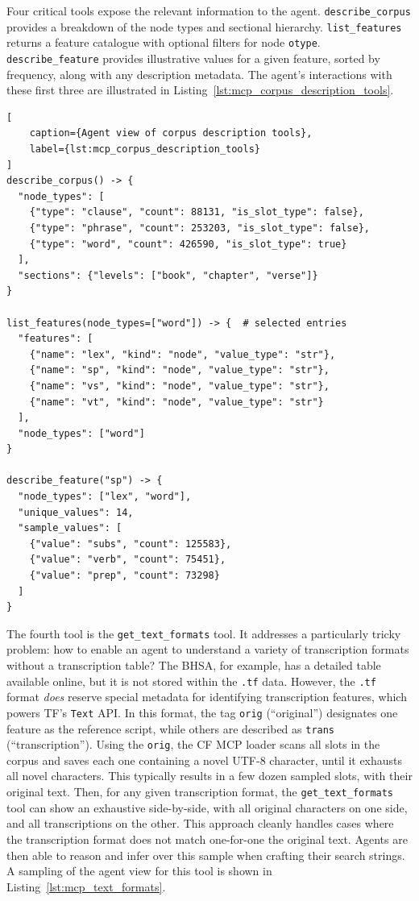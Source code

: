 \documentclass[11pt,a4paper]{article}
\begin{document}
Four critical tools expose the relevant information to the agent. \texttt{describe\_corpus}
provides a breakdown of the node types and sectional hierarchy. \texttt{list\_features}
returns a feature catalogue with optional filters for node \texttt{otype}.
\texttt{describe\_feature} provides illustrative values for a given feature, sorted by frequency,
along with any description metadata. The agent's interactions with these
first three are illustrated in Listing~\ref{lst:mcp_corpus_description_tools}.

\begin{lstlisting}[
    caption={Agent view of corpus description tools},
    label={lst:mcp_corpus_description_tools}
]
describe_corpus() -> {
  "node_types": [
    {"type": "clause", "count": 88131, "is_slot_type": false},
    {"type": "phrase", "count": 253203, "is_slot_type": false},
    {"type": "word", "count": 426590, "is_slot_type": true}
  ],
  "sections": {"levels": ["book", "chapter", "verse"]}
}

list_features(node_types=["word"]) -> {  # selected entries
  "features": [
    {"name": "lex", "kind": "node", "value_type": "str"},
    {"name": "sp", "kind": "node", "value_type": "str"},
    {"name": "vs", "kind": "node", "value_type": "str"},
    {"name": "vt", "kind": "node", "value_type": "str"}
  ],
  "node_types": ["word"]
}

describe_feature("sp") -> {
  "node_types": ["lex", "word"],
  "unique_values": 14,
  "sample_values": [
    {"value": "subs", "count": 125583},
    {"value": "verb", "count": 75451},
    {"value": "prep", "count": 73298}
  ]
}

\end{lstlisting}

The fourth tool is the \texttt{get\_text\_formats} tool. It addresses a particularly tricky
problem: how to enable an agent to understand a variety of transcription formats without
a transcription table? The BHSA, for example, has a detailed table available online,
but it is not stored within the \texttt{.tf} data. However, the \texttt{.tf} format \textit{does}
reserve special metadata for identifying transcription features, which powers TF's \texttt{Text}
API. In this format, the tag \texttt{orig} (``original'') designates one feature as the reference script,
while others are described as \texttt{trans} (``transcription''). Using the \texttt{orig}, the CF
MCP loader scans all slots in the corpus and saves each one containing a novel UTF-8 character,
until it exhausts all novel characters. This typically results in a few dozen sampled slots,
with their original text. Then, for any given transcription format, the \texttt{get\_text\_formats} tool
can show an exhaustive side-by-side, with all original characters on one side, and all transcriptions
on the other. This approach cleanly handles cases where the transcription format does not match one-for-one
the original text. Agents are then able to reason and infer over this sample when crafting their search strings.
A sampling of the agent view for this tool is shown in Listing~\ref{lst:mcp_text_formats}.
\end{document}
